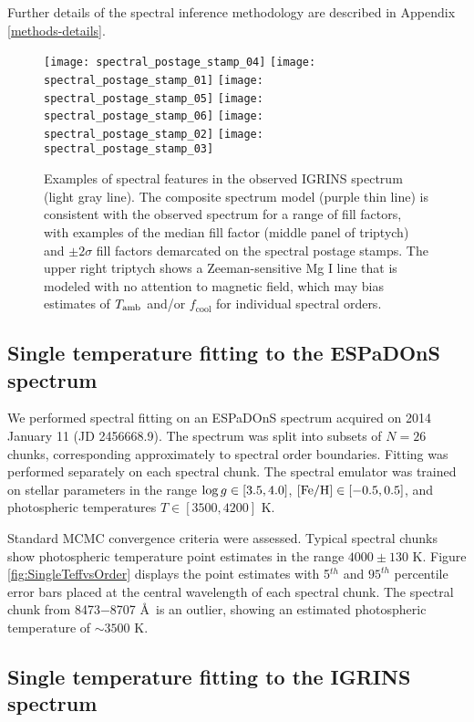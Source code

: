 \documentclass[twocolumn]{emulateapj}%
\begin{document}
Further details of the spectral inference methodology are described in Appendix \ref{methods-details}.


\begin{figure*}
 \centering
 \texttt{[image: spectral\_postage\_stamp\_04]} 
 \texttt{[image: spectral\_postage\_stamp\_01]} 
 \texttt{[image: spectral\_postage\_stamp\_05]} 
 \texttt{[image: spectral\_postage\_stamp\_06]} 
 \texttt{[image: spectral\_postage\_stamp\_02]} 
 \texttt{[image: spectral\_postage\_stamp\_03]} 
 \caption{Examples of spectral features in the observed IGRINS spectrum (light gray line).  The composite spectrum model (purple thin line) is consistent with the observed spectrum for a range of fill factors, with examples of the median fill factor (middle panel of triptych) and $\pm2\sigma$ fill factors demarcated on the spectral postage stamps.  The upper right triptych shows a Zeeman-sensitive Mg I line that is modeled with no attention to magnetic field, which may bias estimates of $T_\textrm{amb}$ and/or $f_{\mathrm{cool}}$ for individual spectral orders.}
 \label{fig:specPostageStamp}
\end{figure*}

\subsection{Single temperature fitting to the ESPaDOnS spectrum}\label{sec:ESP_starfish}

We performed spectral fitting on an ESPaDOnS spectrum acquired on 2014 January 11 (JD 2456668.9).  The spectrum was split into subsets of $N=26$ chunks, corresponding approximately to spectral order boundaries.  Fitting was performed separately on each spectral chunk.  The spectral emulator was trained on stellar parameters in the range $\log g \in [3.5, 4.0]$, $[{\rm Fe}/{\rm H}] \in [-0.5, 0.5]$, and photospheric temperatures $ T \in [3500, 4200]$ K.

Standard MCMC convergence criteria were assessed.  Typical spectral chunks show photospheric temperature point estimates in the range $4000\pm130$ K.  Figure \ref{fig:SingleTeffvsOrder} displays the point estimates with 5$^{th}$ and $95^{th}$ percentile error bars placed at the central wavelength of each spectral chunk.  The spectral chunk from 8473$-$8707 \AA\ is an outlier, showing an estimated photospheric temperature of $\sim3500$ K.

\subsection{Single temperature fitting to the IGRINS spectrum}\label{sec:IGR_starfish}
\end{document}
